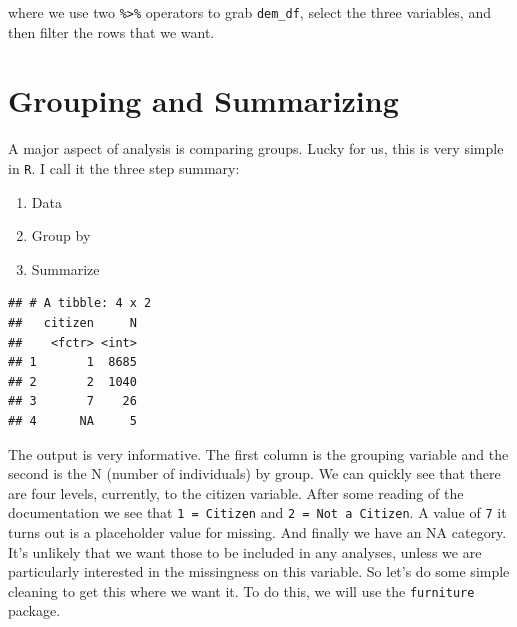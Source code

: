 \documentclass[]{tufte-book}
\newenvironment{Shaded}{}{}
\newcommand{\KeywordTok}[1]{\textcolor[rgb]{0.00,0.44,0.13}{\textbf{#1}}}
\newcommand{\DataTypeTok}[1]{\textcolor[rgb]{0.56,0.13,0.00}{#1}}
\newcommand{\StringTok}[1]{\textcolor[rgb]{0.25,0.44,0.63}{#1}}
\newcommand{\OperatorTok}[1]{\textcolor[rgb]{0.40,0.40,0.40}{#1}}
\newcommand{\NormalTok}[1]{#1}
\providecommand{\tightlist}{%
  \setlength{\itemsep}{0pt}\setlength{\parskip}{0pt}}
\theoremstyle{definition}
\theoremstyle{definition}
\theoremstyle{remark}
\begin{document}
where we use two \texttt{\%\textgreater{}\%} operators to grab
\texttt{dem\_df}, select the three variables, and then filter the rows
that we want.

\section*{Grouping and Summarizing}\label{grouping-and-summarizing}

A major aspect of analysis is comparing groups. Lucky for us, this is
very simple in \texttt{R}. I call it the three step summary:

\begin{enumerate}
\def\labelenumi{\arabic{enumi}.}
\tightlist
\item
  Data
\item
  Group by
\item
  Summarize
\end{enumerate}

\begin{Shaded}
\end{Shaded}

\begin{verbatim}
## # A tibble: 4 x 2
##   citizen     N
##    <fctr> <int>
## 1       1  8685
## 2       2  1040
## 3       7    26
## 4      NA     5
\end{verbatim}

The output is very informative. The first column is the grouping
variable and the second is the N (number of individuals) by group. We
can quickly see that there are four levels, currently, to the citizen
variable. After some reading of the documentation we see that
\texttt{1\ =\ Citizen} and \texttt{2\ =\ Not\ a\ Citizen}. A value of
\texttt{7} it turns out is a placeholder value for missing. And finally
we have an NA category. It's unlikely that we want those to be included
in any analyses, unless we are particularly interested in the
missingness on this variable. So let's do some simple cleaning to get
this where we want it. To do this, we will use the \texttt{furniture}
package.
\end{document}
